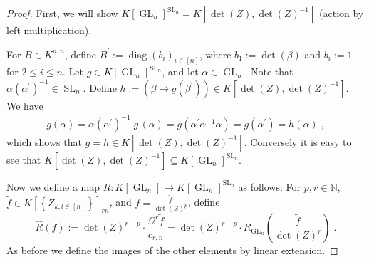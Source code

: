 \begin{proof}
  First, we will show $ K \left\lbrack \operatorname{GL}_n \right\rbrack ^{\operatorname{SL}_n} = K \left\lbrack \operatorname{det} (Z) , \operatorname{det} (Z) ^{-1} \right\rbrack $ (action by left multiplication).

  For $B \in K^{n,n}$, define $B^\prime := \operatorname{diag}(b_i)_{i\in[n]}$, where $b_1 := \operatorname{det}(\beta)$ and $b_i := 1$ for $2\leq i\leq n$.
  Let $g \in K \left\lbrack \operatorname{GL}_n \right\rbrack ^{ \operatorname{SL}_n }$, and let $ \alpha \in \operatorname{GL}_n $.
  Note that $\alpha (\alpha^\prime)^{-1} \in \operatorname{SL}_n$.
  Define $ h := \left( \beta \mapsto g \left(\beta^\prime \right) \right) \in K \left\lbrack \operatorname{det} (Z) , \operatorname{det} (Z) ^{-1} \right\rbrack $.
  We have
  \begin{equation*}
    \begin{aligned}
      g ( \alpha )
      = \alpha (\alpha^\prime)^{-1} . g \, (\alpha)
      = g \left( \alpha^\prime \alpha ^{-1} \alpha \right) 
      = g \left( \alpha^\prime \right)
      = h (\alpha) \; ,
    \end{aligned}
  \end{equation*}
  which shows that $ g = h \in K \left\lbrack \operatorname{det} (Z) , \operatorname{det} (Z) ^{-1} \right\rbrack $.
  Conversely it is easy to see that $ K \left\lbrack \operatorname{det} (Z) , \operatorname{det} (Z) ^{-1} \right\rbrack \subseteq K \left\lbrack \operatorname{GL}_n \right\rbrack ^{\operatorname{SL}_n } $.

  Now we define a map $\hat{R} \colon K \left\lbrack \operatorname{GL}_n \right\rbrack \rightarrow K \left\lbrack \operatorname{GL}_n \right\rbrack ^{\operatorname{SL}_n} $ as follows:
  For $ p,r \in \mathbb{N} $, $ \tilde{f} \in K \left\lbrack \left\lbrace Z_{k,l \in [ n ]} \right\rbrace \right\rbrack_{rn} $, and $ f = \frac{\tilde{f}}{\operatorname{det} (Z)^p } $, define
  \begin{equation*}
    \hat{R} (f) := \operatorname{det} (Z)^{r-p} \cdot \frac{ \Omega^r \tilde{f} }{ c_{r,n} }
    = \operatorname{det} (Z)^{r-p} \cdot R_{\operatorname{GL}_n} \left( \frac{\tilde{f}}{\operatorname{det} (Z) ^r} \right) \; .
  \end{equation*}
  As before we define the images of the other elements by linear extension.
  

\end{proof}
